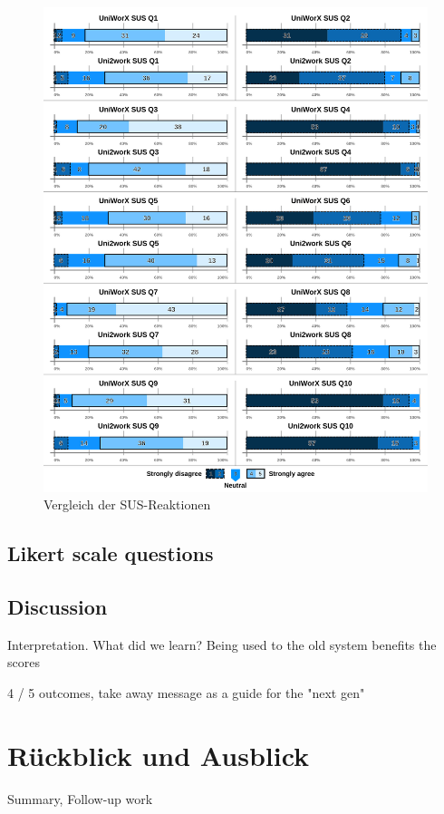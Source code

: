 \documentclass[11pt,a4paper,twoside,ngerman]{article}
\begin{document}
\begin{figure}
    \centering
    \includegraphics[width=\textwidth]{likert_comparison.jpg}
    \caption{Vergleich der SUS-Reaktionen}
    \label{fig:results_sus}
\end{figure}

\subsection{Likert scale questions} \label{sec:results_likert}

\subsection{Discussion} \label{sec:results_discussion}
Interpretation. What did we learn?
Being used to the old system benefits the scores

4 / 5 outcomes, take away message as a guide for the "next gen"

\clearpage
\section{Rückblick und Ausblick}
Summary, Follow-up work
\end{document}
